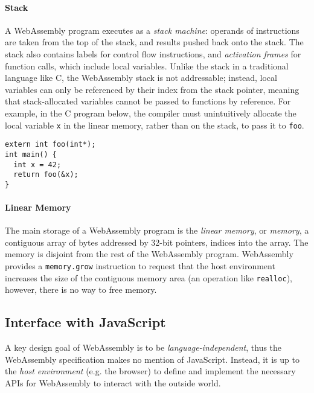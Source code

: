\paragraph{Stack}

A WebAssembly program executes as a \emph{stack machine}: operands of instructions are taken from the top of the stack, and results pushed back onto the stack. The stack also contains labels for control flow instructions, and \emph{activation frames} for function calls, which include local variables. Unlike the stack in a traditional language like C, the WebAssembly stack is not addressable; instead, local variables can only be referenced by their index from the stack pointer, meaning that stack-allocated variables cannot be passed to functions by reference. For example, in the C program below, the compiler must unintuitively allocate the local variable \texttt{x} in the linear memory, rather than on the stack, to pass it to \texttt{foo}.

\vspace*{-1em}

\begin{center}
\begin{verbatim}
extern int foo(int*);
int main() {
  int x = 42;
  return foo(&x);
}
\end{verbatim}
\end{center}

\vspace*{-2em}

\paragraph{Linear Memory}

The main storage of a WebAssembly program is the \emph{linear memory}, or \emph{memory}, a contiguous array of bytes addressed by 32-bit pointers, indices into the array. The memory is disjoint from the rest of the WebAssembly program. WebAssembly provides a \texttt{memory.grow} instruction to request that the host environment increases the size of the contiguous memory area (an operation like \texttt{realloc}), however, there is no way to free memory.

\subsection{Interface with JavaScript}

\label{sec:wasm-js-interface}

A key design goal of WebAssembly is to be \emph{language-independent}, thus the WebAssembly specification makes no mention of JavaScript. Instead, it is up to the \emph{host environment} (e.g. the browser) to define and implement the necessary APIs for WebAssembly to interact with the outside world.

